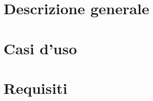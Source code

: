 \documentclass[a4paper, 12pt]{article}
\begin{document}
            \section{Descrizione generale}
                
                \newpage
            \section{Casi d'uso}
                
                \newpage
            \section{Requisiti}
                
                \newpage
		    
		\newpage
\end{document}
